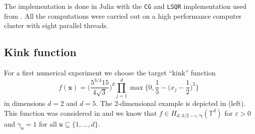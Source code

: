 \documentclass[a4paper]{amsart}
\begin{document}
The implementation is done in Julia with the \texttt{CG} and \texttt{LSQR} implementation used from \cite{iterativesolvers}.
All the computations were carried out on a high performance computer cluster \cite{katana} with eight parallel threads.



\subsection{Kink function}\label{ssec:kink} 

For a first numerical experiment we choose the target ``kink'' function
\begin{equation}\label{eq:kink}
    f(\bm x) = \Big(\frac{5^{3/4}15}{4\sqrt 3}\Big)^d \prod_{j=1}^{d} \max\Big\{0, \frac 15 - \Big(x_j-\frac 12\Big)^2 \Big\}
\end{equation}
in dimensions $d=2$ and $d=5$.
The 2-dimensional example is depicted in  (left).
This function was considered in \cite{BKUV17, KUV19, BKPU22} and we know that $f\in H_{d,3/2-\varepsilon,\bm\gamma}(\mathds T^d)$ for $\varepsilon>0$ and $\gamma_{\mathfrak u}=1$ for all $\mathfrak u\subseteq\{1,\dots,d\}$.
\end{document}
